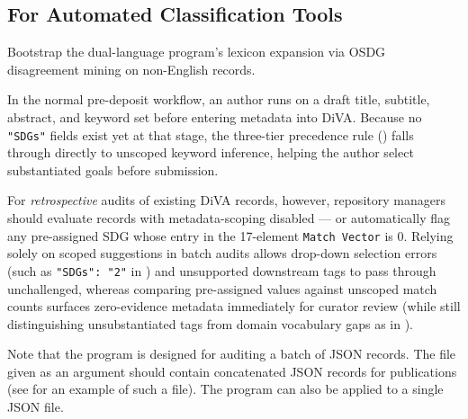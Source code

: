 \subsection{For Automated Classification Tools}
\label{rec:ForAutomatedClassificationTools}
Bootstrap the dual-language program's lexicon expansion via OSDG disagreement mining on non-English records.

\begin{recommendation}
\label{rec:unscopedRetrospectiveAudits}
In the normal pre-deposit workflow, an author runs  on a draft title, subtitle, abstract, and keyword set before entering metadata into \gls{DiVA}. Because no \texttt{"SDGs"} fields exist yet at that stage, the three-tier precedence rule () falls through directly to unscoped keyword inference, helping the author select substantiated goals before submission.

For \emph{retrospective} audits of existing \gls{DiVA} records, however, repository managers should evaluate records with metadata-scoping disabled --- or automatically flag any pre-assigned \gls{SDG} whose entry in the 17-element \texttt{Match Vector} is \num{0}. Relying solely on scoped suggestions in batch audits allows drop-down selection errors (such as \texttt{"SDGs": "2"} in ) and unsupported downstream tags to pass through unchallenged, whereas comparing pre-assigned values against unscoped match counts surfaces zero-evidence metadata immediately for curator review (while still distinguishing unsubstantiated tags from domain vocabulary gaps as in ).
\end{recommendation}

Note that the program  is designed for auditing a batch of \gls{JSON} records. The file given as an argument should contain concatenated \gls{JSON} records for publications (see  for an example of such a file). The program can also be applied to a single \gls{JSON} file.

